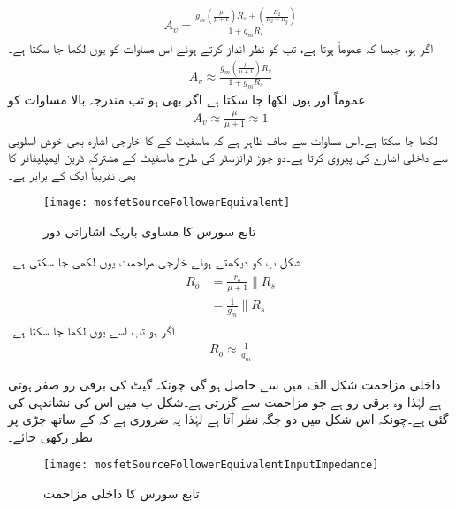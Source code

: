 \begin{align}\label{مساوات_ماسفیٹ_تابع_مخارج_افزائش_ب}
A_v=\frac{g_m \left(\frac{\mu}{\mu+1}\right) R_s +\left(\frac{R_2}{R_2+R_g}\right)}{1+g_m R_s}
\end{align}
اگر  ہو، جیسا کہ عموماً ہوتا ہے، تب  کو نظر انداز کرتے ہوئے اس مساوات کو یوں لکھا جا سکتا ہے۔
\begin{align}\label{مساوات_ماسفیٹ_تابع_مخارج_افزائش_پ}
A_v \approx \frac{g_m \left(\frac{\mu}{\mu+1}\right) R_s}{1+g_m R_s}
\end{align}
عموماً  اور یوں  لکھا جا سکتا ہے۔اگر  بھی ہو تب مندرجہ بالا مساوات کو
\begin{align}\label{مساوات_ماسفیٹ_تابع_مخارج_افزائش_ت}
A_v \approx \frac{\mu}{\mu+1} \approx 1
\end{align}
لکھا جا سکتا ہے۔اس مساوات سے صاف ظاہر ہے کہ ماسفیٹ کے  کا خارجی اشارہ بھی خوش اسلوبی سے داخلی اشارے کی پیروی کرتا ہے۔دو جوڑ ٹرانزسٹر کی طرح ماسفیٹ کے مشترکہ ڈرین ایمپلیفائر کا  بھی تقریباً ایک کے برابر ہے۔
% 
\begin{figure}
\centering
\texttt{[image: mosfetSourceFollowerEquivalent]}
\caption{تابع سورس کا مساوی باریک اشاراتی دور}
\label{شکل_ماسفیٹ_تابع_مخارج_مساوی}
\end{figure}

شکل  ب کو دیکھتے ہوئے خارجی مزاحمت یوں لکھی جا سکتی ہے۔
\begin{gather}
\begin{aligned}
R_o&=\frac{r_o}{\mu+1} \mathbin{\|} R_s \\
&=\frac{1}{g_m} \mathbin{\|} R_s
\end{aligned}
\end{gather}
اگر  ہو تب اسے یوں لکھا جا سکتا ہے۔
\begin{align}
R_o \approx \frac{1}{g_m}
\end{align}

داخلی مزاحمت شکل  الف میں  سے حاصل ہو گی۔چونکہ گیٹ کی برقی رو صفر ہوتی ہے لہٰذا  وہ برقی رو ہے جو مزاحمت  سے گزرتی ہے۔شکل  ب میں اس کی نشاندہی کی گئی ہے۔چونکہ اس شکل میں  دو جگہ نظر آتا ہے لہٰذا یہ ضروری ہے کہ  کے ساتھ جڑی  پر نظر رکھی جائے۔
\begin{figure}
\centering
\texttt{[image: mosfetSourceFollowerEquivalentInputImpedance]}
\caption{تابع سورس کا داخلی مزاحمت}
\label{شکل_ماسفیٹ_تابع_مخارج_داخلی_مزاحمت}
\end{figure}

